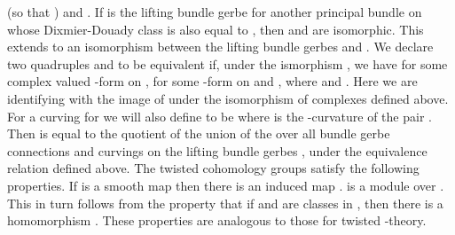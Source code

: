\documentclass[a4paper,reqno]{amsart}
\theoremstyle{plain}
\theoremstyle{definition}
\theoremstyle{remark}
\numberwithin{equation}{section}
\numberwithin{figure}{section}
\providecommand{\cH}{{\mathcal H}}
\providecommand{\<}{\langle}
\renewcommand{\>}{\rangle}
\begin{document}
\coordHE{} (so that \coordHE{}) and \coordHE{}.  
If \coordHE{} is the lifting bundle gerbe for another principal 
\myHighlight{$PU(\cH)$}\coordHE{} bundle \coordHE{} on \coordHE{} whose Dixmier-Douady class 
is also equal to \myHighlight{$[H]$}\coordHE{}, then \coordHE{} and \coordHE{} are isomorphic.  
This extends to an isomorphism between the lifting 
bundle gerbes \coordHE{} and \coordHE{}.  We declare 
two quadruples \coordHE{} 
and \coordHE{} 
to be equivalent if, under the ismorphism 
\coordHE{}, we have \coordHE{} 
for some complex valued \coordHE{}-form \myHighlight{$\rho$}\coordHE{} on \coordHE{},   
\coordHE{} for some 
\coordHE{}-form \myHighlight{$\lambda$}\coordHE{} on \coordHE{}  
and \myHighlight{$[\omega'] = [\exp(\lambda)\omega]$}\coordHE{}, where 
\coordHE{} and \coordHE{}.  Here we are identifying 
\myHighlight{$[\omega']$}\coordHE{} with the image of \myHighlight{$[\omega]$}\coordHE{} under the isomorphism 
of complexes \coordHE{} 
defined above.  For a curving \coordHE{} for 
\coordHE{} we will also define \coordHE{} to 
be \coordHE{} where \coordHE{} is the \coordHE{}-curvature 
of the pair \coordHE{}.  Then \coordHE{} 
is equal to the quotient of the union of the \coordHE{} 
over all bundle gerbe connections \coordHE{} and curvings \coordHE{} 
on the lifting bundle gerbes \coordHE{},    
under the equivalence relation defined above.  The twisted cohomology 
groups satisfy the following properties.  If 
\coordHE{} is a smooth map then there is an 
induced map \coordHE{}.  \coordHE{} is a module 
over \coordHE{}.  This in turn follows from the 
property that if \myHighlight{$[H]$}\coordHE{} and \myHighlight{$[H']$}\coordHE{} are classes in 
\coordHE{}, then there is a homomorphism 
\coordHE{}.  These properties are 
analogous to those for twisted \coordHE{}-theory.    
\end{document}
